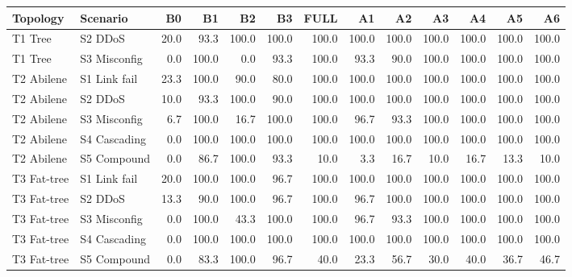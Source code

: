 \begin{tabular}{llrrrrrrrrrrr}
\toprule
Topology & Scenario & B0 & B1 & B2 & B3 & FULL & A1 & A2 & A3 & A4 & A5 & A6 \\
\midrule
T1 Tree & S2 DDoS & 20.0 & 93.3 & 100.0 & 100.0 & 100.0 & 100.0 & 100.0 & 100.0 & 100.0 & 100.0 & 100.0 \\
T1 Tree & S3 Misconfig & 0.0 & 100.0 & 0.0 & 93.3 & 100.0 & 93.3 & 90.0 & 100.0 & 100.0 & 100.0 & 100.0 \\
\midrule
T2 Abilene & S1 Link fail & 23.3 & 100.0 & 90.0 & 80.0 & 100.0 & 100.0 & 100.0 & 100.0 & 100.0 & 100.0 & 100.0 \\
T2 Abilene & S2 DDoS & 10.0 & 93.3 & 100.0 & 90.0 & 100.0 & 100.0 & 100.0 & 100.0 & 100.0 & 100.0 & 100.0 \\
T2 Abilene & S3 Misconfig & 6.7 & 100.0 & 16.7 & 100.0 & 100.0 & 96.7 & 93.3 & 100.0 & 100.0 & 100.0 & 100.0 \\
T2 Abilene & S4 Cascading & 0.0 & 100.0 & 100.0 & 100.0 & 100.0 & 100.0 & 100.0 & 100.0 & 100.0 & 100.0 & 100.0 \\
T2 Abilene & S5 Compound & 0.0 & 86.7 & 100.0 & 93.3 & 10.0 & 3.3 & 16.7 & 10.0 & 16.7 & 13.3 & 10.0 \\
\midrule
T3 Fat-tree & S1 Link fail & 20.0 & 100.0 & 100.0 & 96.7 & 100.0 & 100.0 & 100.0 & 100.0 & 100.0 & 100.0 & 100.0 \\
T3 Fat-tree & S2 DDoS & 13.3 & 90.0 & 100.0 & 96.7 & 100.0 & 96.7 & 100.0 & 100.0 & 100.0 & 100.0 & 100.0 \\
T3 Fat-tree & S3 Misconfig & 0.0 & 100.0 & 43.3 & 100.0 & 100.0 & 96.7 & 93.3 & 100.0 & 100.0 & 100.0 & 100.0 \\
T3 Fat-tree & S4 Cascading & 0.0 & 100.0 & 100.0 & 100.0 & 100.0 & 100.0 & 100.0 & 100.0 & 100.0 & 100.0 & 100.0 \\
T3 Fat-tree & S5 Compound & 0.0 & 83.3 & 100.0 & 96.7 & 40.0 & 23.3 & 56.7 & 30.0 & 40.0 & 36.7 & 46.7 \\
\bottomrule
\end{tabular}
